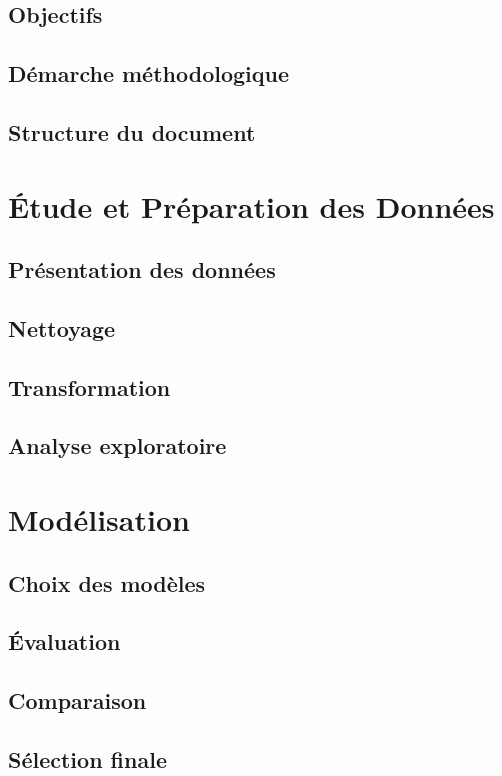 \documentclass[12pt,a4paper]{report}
\begin{document}
\section{Objectifs}
\section{Démarche méthodologique}
\section{Structure du document}

\chapter{Étude et Préparation des Données}
\section{Présentation des données}
\section{Nettoyage}
\section{Transformation}
\section{Analyse exploratoire}

\chapter{Modélisation}
\section{Choix des modèles}
\section{Évaluation}
\section{Comparaison}
\section{Sélection finale}
\end{document}
